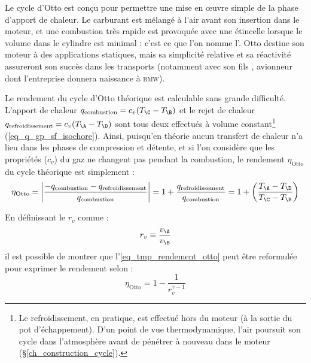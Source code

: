 		Le cycle d’Otto est conçu pour permettre une mise en œuvre simple de la phase d’apport de chaleur. Le carburant est mélangé à l’air avant son insertion dans le moteur, et une combustion très rapide est provoquée avec une étincelle lorsque le volume dans le cylindre est minimal : c’est ce que l’on nomme l’. Otto destine son moteur à des applications statiques, mais sa simplicité relative et sa réactivité assureront son succès dans les transports (notamment avec son fils , avionneur dont l’entreprise donnera naissance à \textsc{bmw}).

		Le rendement du cycle d’Otto théorique est calculable sans grande difficulté. L’apport de chaleur $q_\text{combustion} = c_v (T_\C - T_\B )$ et le rejet de chaleur $q_\text{refroidissement} = c_v (T_\A - T_\D)$ sont tous deux effectués à volume constant\footnote{Le refroidissement, en pratique, est effectué hors du moteur (à la sortie du pot d’échappement). D’un point de vue thermodynamique, l’air poursuit son cycle dans l’atmosphère avant de pénétrer à nouveau dans le moteur (\S\ref{ch_construction_cycle}).} (\ref{eq_q_gp_sf_isochore}). Ainsi, puisqu’en théorie aucun transfert de chaleur n’a lieu dans les phases de compression et détente, et si l’on considère que les propriétés ($c_v$) du gaz ne changent pas pendant la combustion, le rendement $\eta_\text{Otto}$ du cycle théorique est simplement :
		\begin{equation}
			\eta_\text{Otto} = \left| \frac{-q_\text{combustion} - q_\text{refroidissement}}{q_\text{combustion}} \right| = 1 + \frac{q_\text{refroidissement}}{q_\text{combustion}} = 1 + \left( \frac{T_\A - T_\D}{T_\C - T_\B } \right) \label{eq_tmp_rendement_otto}
		\end{equation}

		En définissant le  $r_v$ comme :
		\begin{equation}
			r_v \equiv \frac{v_\A}{v_\B}
		\end{equation}
		il est possible de montrer que l’\cref{eq_tmp_rendement_otto} peut être reformulée pour exprimer le rendement selon :
		\begin{equation}
			\eta_\text{Otto} = 1 - \frac{1}{r_v^{\gamma -1}}
		\end{equation}

